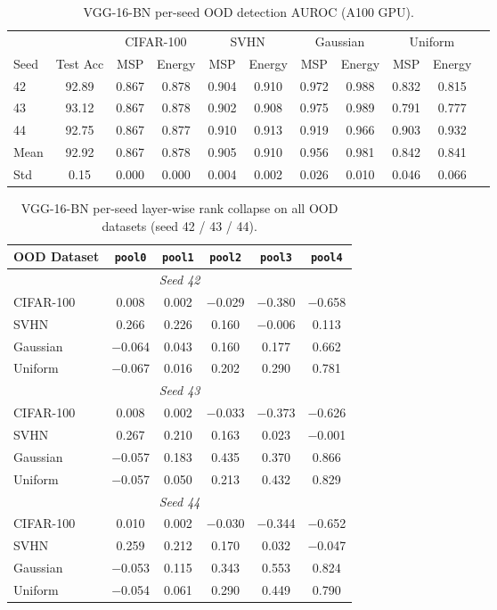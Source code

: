 \documentclass{article}
\begin{document}
\begin{table}[h]
\centering
\caption{VGG-16-BN per-seed OOD detection AUROC (A100 GPU).}
\label{tab:vgg_perseed}
\small
\begin{tabular}{@{}lcccccccccc@{}}
\toprule
& & \multicolumn{2}{c}{CIFAR-100} & \multicolumn{2}{c}{SVHN} & \multicolumn{2}{c}{Gaussian} & \multicolumn{2}{c}{Uniform} \\
\cmidrule(lr){3-4} \cmidrule(lr){5-6} \cmidrule(lr){7-8} \cmidrule(lr){9-10}
Seed & Test Acc & MSP & Energy & MSP & Energy & MSP & Energy & MSP & Energy \\
\midrule
42 & 92.89 & 0.867 & 0.878 & 0.904 & 0.910 & 0.972 & 0.988 & 0.832 & 0.815 \\
43 & 93.12 & 0.867 & 0.878 & 0.902 & 0.908 & 0.975 & 0.989 & 0.791 & 0.777 \\
44 & 92.75 & 0.867 & 0.877 & 0.910 & 0.913 & 0.919 & 0.966 & 0.903 & 0.932 \\
\midrule
Mean & 92.92 & 0.867 & 0.878 & 0.905 & 0.910 & 0.956 & 0.981 & 0.842 & 0.841 \\
Std & 0.15 & 0.000 & 0.000 & 0.004 & 0.002 & 0.026 & 0.010 & 0.046 & 0.066 \\
\bottomrule
\end{tabular}
\end{table}

\begin{table}[h]
\centering
\caption{VGG-16-BN per-seed layer-wise rank collapse on all OOD datasets (seed 42 / 43 / 44).}
\label{tab:vgg_rc_perseed}
\small
\begin{tabular}{@{}lccccc@{}}
\toprule
OOD Dataset & \texttt{pool0} & \texttt{pool1} & \texttt{pool2} & \texttt{pool3} & \texttt{pool4} \\
\midrule
\multicolumn{6}{c}{\emph{Seed 42}} \\
CIFAR-100 & 0.008 & 0.002 & $-$0.029 & $-$0.380 & $-$0.658 \\
SVHN & 0.266 & 0.226 & 0.160 & $-$0.006 & 0.113 \\
Gaussian & $-$0.064 & 0.043 & 0.160 & 0.177 & 0.662 \\
Uniform & $-$0.067 & 0.016 & 0.202 & 0.290 & 0.781 \\
\midrule
\multicolumn{6}{c}{\emph{Seed 43}} \\
CIFAR-100 & 0.008 & 0.002 & $-$0.033 & $-$0.373 & $-$0.626 \\
SVHN & 0.267 & 0.210 & 0.163 & 0.023 & $-$0.001 \\
Gaussian & $-$0.057 & 0.183 & 0.435 & 0.370 & 0.866 \\
Uniform & $-$0.057 & 0.050 & 0.213 & 0.432 & 0.829 \\
\midrule
\multicolumn{6}{c}{\emph{Seed 44}} \\
CIFAR-100 & 0.010 & 0.002 & $-$0.030 & $-$0.344 & $-$0.652 \\
SVHN & 0.259 & 0.212 & 0.170 & 0.032 & $-$0.047 \\
Gaussian & $-$0.053 & 0.115 & 0.343 & 0.553 & 0.824 \\
Uniform & $-$0.054 & 0.061 & 0.290 & 0.449 & 0.790 \\
\bottomrule
\end{tabular}
\end{table}
\end{document}
